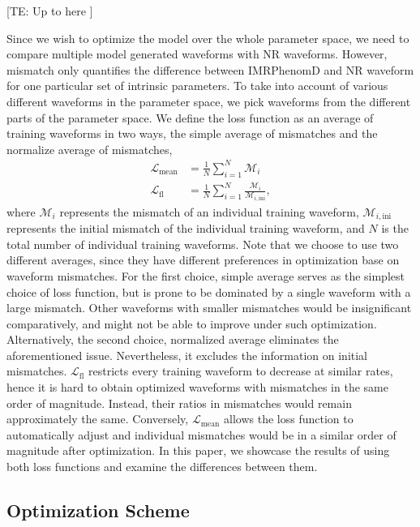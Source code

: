 \documentclass[twocolumn]{aastex631}
\newcommand{\te}[1]{{\color{rr}[TE: #1 ]}}
\begin{document}
\te{Up to here}

Since we wish to optimize the model over the whole parameter space, we need to compare multiple model generated waveforms with NR waveforms. However, mismatch only quantifies the difference between IMRPhenomD and NR waveform for one particular set of intrinsic parameters. To take into account of various different waveforms in the parameter space, we pick waveforms from the different parts of the parameter space. We define the loss function as an average of training waveforms in two ways, the simple average of mismatches and the normalize average of mismatches,  
\begin{align}
	\mathcal{L}_{\mathrm{mean}}&=\frac{1}{N}\sum_{i=1}^N\mathcal{M}_i \\
	\mathcal{L}_{\mathrm{fl}}&=\frac{1}{N}\sum_{i=1}^N\frac{\mathcal{M}_i}{\mathcal{M}_{i,\mathrm{ini}}},
\end{align}	
where $\mathcal{M}_i$ represents the mismatch of an individual training waveform,
$\mathcal{M}_{i,\mathrm{ini}}$ represents the initial mismatch of the individual
training waveform, and $N$ is the total number of individual training waveforms.
Note that we choose to use two different averages, since they have different 
preferences in optimization base on waveform mismatches. For the first choice, 
simple average serves as the simplest choice of loss function, but is prone to 
be dominated by a single waveform with a large mismatch. Other waveforms with 
smaller mismatches would be insignificant comparatively, and might not be able 
to improve under such optimization. Alternatively, the second choice, normalized 
average eliminates the aforementioned issue. Nevertheless, it excludes the
information on initial mismatches. $\mathcal{L}_{\mathrm{fl}}$ restricts every
training waveform to decrease at similar rates, hence it is hard to obtain
optimized waveforms with mismatches in the same order of magnitude. Instead,
their ratios in mismatches would remain approximately the same. Conversely,
$\mathcal{L}_{\mathrm{mean}}$ allows the loss function to automatically adjust
and individual mismatches would be in a similar order of magnitude after 
optimization. In this paper, we showcase the results of using both loss functions 
and examine the differences between them. 

\subsection{Optimization Scheme} \label{subsec:optimization}
\end{document}
